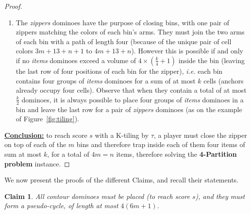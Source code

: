 \documentclass[11pt,a4paper]{article}
\newtheorem{claim}{\textbf{Claim}}
\newcommand{\1}{\mathbb{1}}
\newcommand{\0}{\mathbb{0}}
\begin{document}
\begin{proof}
\begin{enumerate}[topsep=.5em,itemsep=.5em]
    \item The {\em zippers} dominoes have the purpose of closing bins, with one
      pair of zippers matching the colors of each bin's arms. They must
      join the two arms of each bin with a path of length four (because of the
      unique pair of cell colors $3m+13+n+1$ to $4m+13+n$). However this is
      possible if and only if no {\em items} dominoes exceed a volume of $4
      \times (\frac{k}{4}+1)$ inside the bin (leaving the last row of four
      positions of each bin for the zipper), {\em i.e.} each bin contains four
      groups of {\em items} dominoes for a sum of at most $k$ cells (anchors
      already occupy four cells). Observe that when they contain a total of at
      most $\frac{k}{2}$ dominoes, it is always possible to place four groups
      of {\em items} dominoes in a bin and leave the last row for a pair of
      {\em zippers} dominoes (as on the example of Figure~\ref{fig:tiling}).
  \end{enumerate}

  \noindent\underline{\bf Conclusion:} to reach score $s$ with a K-tiling by
  $\tau$, a player must close the zipper on top of each of the $m$ bins and
  therefore trap inside each of them four items of sum at most $k$, for a total
  of $4m=n$ items, therefore solving the {\bf 4-Partition problem} instance.
\end{proof}


We now present the proofs of the different Claims, and recall their statements.

\setcounter{claim}{0}

\begin{claim}
  All {\em contour} dominoes must
  be placed (to reach score $s$), and they must form a pseudo-cycle,
  of length at most $4(6m+1)$.
\end{claim}
\end{document}
